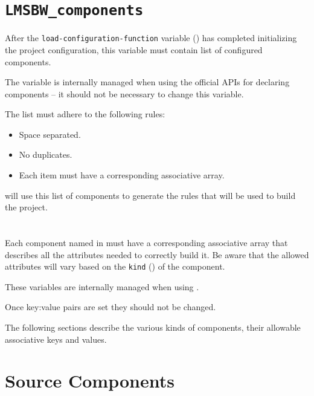 \section{\texttt{LMSBW\_components}}\label{variables:lmsbw-components}

After the \texttt{load-configuration-function} variable
() has completed
initializing the project configuration, this variable must contain list
of configured components.

The variable is internally managed when using the official APIs for
declaring components -- it should not be necessary to change this
variable.

The list must adhere to the following rules:

\begin{itemize}
\item Space separated.
\item No duplicates.
\item Each item must have a corresponding 
  associative array.
\end{itemize}

\lmsbw will use this list of components to generate the rules that
will be used to build the project.

\section{}\label{variables:lmsbw-component-component}

Each component named in \lmsbwcomponents must have a corresponding
associative array that describes all the attributes needed to
correctly build it.  Be aware that the allowed attributes will vary
based on the \texttt{kind} () of the component.

These variables are internally managed when using \lmsbw.

Once key:value pairs are set they should not be changed.

The following sections describe the various kinds of components, their
allowable associative keys and values.

\section{Source Components}

